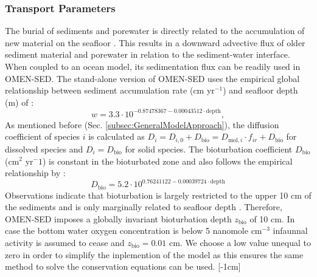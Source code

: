 \documentclass[gmd, manuscript]{copernicus}
\begin{document}
\subsubsection{Transport Parameters}
The burial of sediments and porewater is directly related to the accumulation of new material on the seafloor \citep[i.e. sedimentation,][]{burdige2006geochemistry}. 
This results in a downward advective flux of older sediment material and porewater in relation to the sediment-water interface. When coupled to an ocean model, its sedimentation flux can be readily used in OMEN-SED. 
The stand-alone version of OMEN-SED uses the empirical global relationship between sediment accumulation rate (cm yr$^{-1}$) and seafloor depth (m) of \citet{middelburg_empirical_1997}: 
\begin{equation}
 w = 3.3\cdot 10^{-0.87478367-0.00043512\cdot \text{depth}}\label{eq:sedimentation_rate},
\end{equation}
As mentioned before (Sec. \ref{subsec:GeneralModelApproach}), the diffusion coefficient of species $i$ is calculated as $D_i=D_{i,0}+D_{\mathrm{bio}}=D_{\mathrm{mol},i}\cdot f_{ir}+D_{\mathrm{bio}}$ for dissolved species and $D_i=D_{\mathrm{bio}}$ for solid species. 
The bioturbation coefficient $D_{\mathrm{bio}}$ (cm$^2$ yr$^-1$) is constant in the bioturbated zone and also follows the empirical relationship by \citet{middelburg_empirical_1997}:
\begin{equation}
 D_{\mathrm{bio}} = 5.2\cdot 10^{0.76241122-0.00039724\cdot \text{depth}}\label{eq:bioturbation_coeff}
\end{equation}
Observations indicate that bioturbation is largely restricted to the upper 10 cm of the sediments and is only marginally related to seafloor depth \citep[e.g.][]{boudreau_mean_1998, teal_global_2010}. 
Therefore, OMEN-SED imposes a globally invariant bioturbation depth $z_{\mathrm{bio}}$ of 10 cm. In case the bottom water oxygen concentration is below 5 nanomole cm$^{-3}$ 
infaunnal activity is assumed to cease and $z_{\mathrm{bio}} = 0.01$ cm. We choose a low value unequal to zero in order to simplify the inplemention of the model as this ensures the same method to solve the conservation equations 
can be used. 
[-1cm]%
\end{document}
